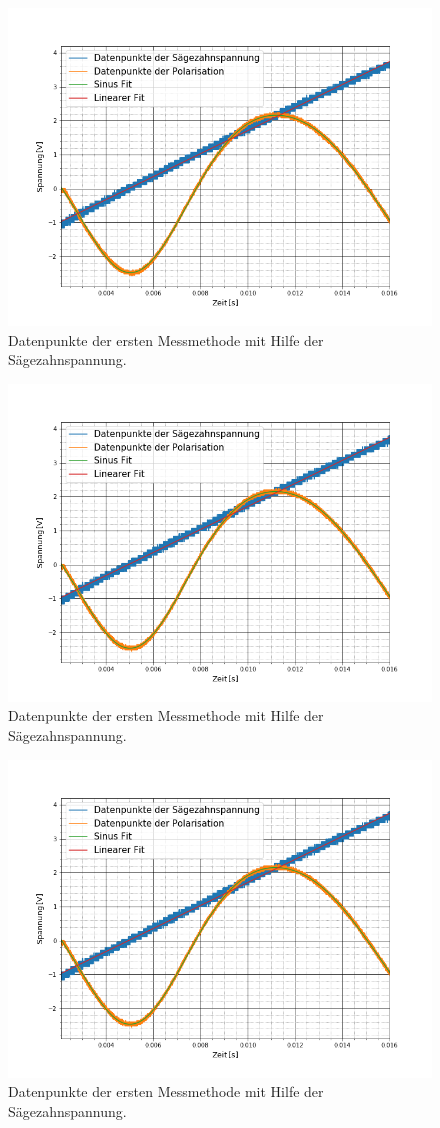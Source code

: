 \begin{figure}[ht]
	\includegraphics[scale=0.5]{Bild/V1_13}
	\centering
	\caption[Plot zu Versuchsteil 1 Nr.13]{Datenpunkte der ersten Messmethode mit Hilfe der Sägezahnspannung.}
\end{figure}
\begin{figure}[ht]
	\includegraphics[scale=0.5]{Bild/V1_14}
	\centering
	\caption[Plot zu Versuchsteil 1 Nr.14]{Datenpunkte der ersten Messmethode mit Hilfe der Sägezahnspannung.}
\end{figure}
\begin{figure}[ht]
	\includegraphics[scale=0.5]{Bild/V1_15}
	\centering
	\caption[Plot zu Versuchsteil 1 Nr.15]{Datenpunkte der ersten Messmethode mit Hilfe der Sägezahnspannung.}
\end{figure}
